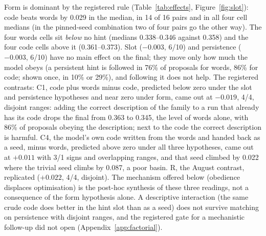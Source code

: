 \documentclass[11pt]{article}
\begin{document}
\begin{table}[!htbp]
\centering\footnotesize
\setlength{\tabcolsep}{4pt}

\caption{Factorial main effects (paired differences over the four cell
pairs that differ only in the factor, four seeds each: median and sign
count $+/-/0$ of 16) on the final best, the family share over the run, and
the family share in generation 0; and the pre-registered contrasts
(per-seed differences, sign count of 4). Dominance rule, registered: the
larger paired median with at least 12 of 16 concordant signs (two-sided
binomial $p\approx0.08$ under independence; 14 of 16, $p\approx0.004$).
Per-arm finals in Appendix~\ref{app:factorial}.}
\label{tab:effects}
\end{table}

Form is dominant by the registered rule (Table~\ref{tab:effects},
Figure~\ref{fig:slot}): code beats words by 0.029 in the median, in 14 of
16 pairs and in all four cell medians (in the pinned-seed combination two
of four pairs go the other way). The four words cells sit \emph{below} no
hint (medians 0.338--0.346 against 0.358) and the four code cells above it
(0.361--0.373). Slot ($-0.003$, 6/10) and persistence ($-0.003$, 6/10)
have no main effect on the final; they move only how much the model obeys
(a persistent hint is followed in 76\% of proposals for words, 86\% for
code; shown once, in 10\% or 29\%), and following it does not help. The
registered contrasts: C1, code plus words minus code, predicted below zero
under the slot and persistence hypotheses and near zero under form, came
out at $-0.019$, 4/4, disjoint ranges: adding the correct description of
the family to a run that already has its code drops the final from 0.363
to 0.345, the level of words alone, with 86\% of proposals obeying the
description; next to the code the correct description is harmful. C4, the
model's own code written from the words and handed back as a seed, minus
words, predicted above zero under all three hypotheses, came out at
$+0.011$ with 3/1 signs and overlapping ranges, and that seed climbed by
0.022 where the trivial seed climbs by 0.087, a poor basin. R, the
August contrast, replicated ($+0.022$, 4/4, disjoint). The mechanism
offered below (obedience displaces optimisation) is the post-hoc
synthesis of these three readings, not a consequence of the form
hypothesis alone. A descriptive interaction (the same crude code does
better in the hint slot than as a seed) does not survive matching on
persistence with disjoint ranges, and the registered gate for a
mechanistic follow-up did not open (Appendix~\ref{app:factorial}).
\end{document}
